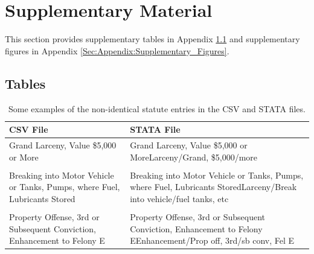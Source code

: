\documentclass[11pt, oneside]{article}   	%
\newcommand{\rowgroup}[1]{\hspace{-1em}#1}
\theoremstyle{ModifiedStyle}
\begin{document}
\section{Supplementary Material}
\label{Sec:Appendix:Supplementary_Material}
This section provides supplementary tables in Appendix \ref{Sec:Appendix:Supplementary_Tables} and supplementary figures in Appendix \ref{Sec:Appendix:Supplementary_Figures}.

\subsection{Tables}
\label{Sec:Appendix:Supplementary_Tables}
\vspace{5mm}

\begin{table}[H]
	\centering
	\caption{Some examples of the non-identical statute entries in the CSV and STATA files.} 
	\vspace{-2mm}
	\setlength\tabcolsep{8pt} %
	{\footnotesize
		\begin{tabular}{L{70mm}L{70mm}}
			\toprule
			CSV File &  STATA File \\
			\midrule
			Grand Larceny, Value \$5,000 or More &
			Grand Larceny, Value \$5,000 or MoreLarceny/Grand, \$5,000/more \\
			& \\
			Breaking into Motor Vehicle or Tanks, Pumps, where Fuel, Lubricants Stored &
			Breaking into Motor Vehicle or Tanks, Pumps, where Fuel, Lubricants StoredLarceny/Break into vehicle/fuel tanks, etc \\
			& \\
			Property Offense, 3rd or Subsequent Conviction, Enhancement to Felony E &
			Property Offense, 3rd or Subsequent Conviction, Enhancement to Felony EEnhancement/Prop off, 3rd/sb conv, Fel E\\
			\bottomrule
		\end{tabular}
	}
	\label{Table_Sentencing_Data_Fields_Statute}
\end{table}
\end{document}
